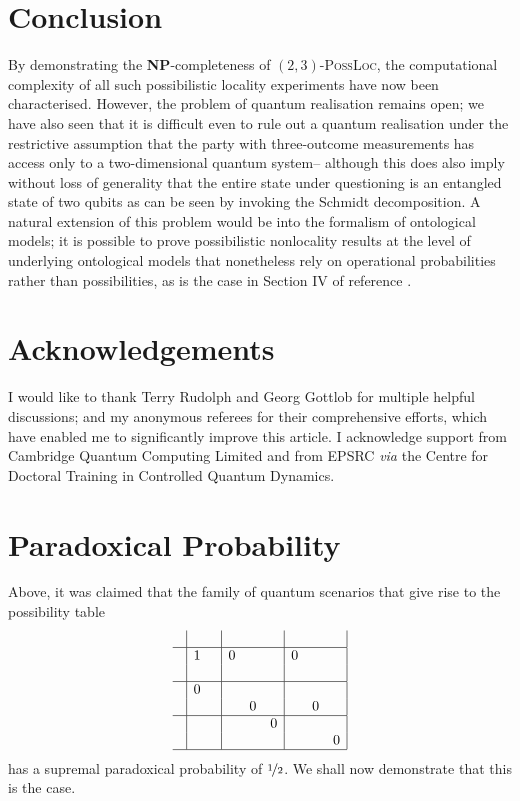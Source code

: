 \documentclass[reprint]{revtex4-1}
\theoremstyle{definition}
\begin{document}
 \section{Conclusion}
 
 By demonstrating the \textbf{NP}-completeness of $(2,3)$-\textsc{PossLoc}, the computational complexity of all such possibilistic locality experiments have now been characterised. However, the problem of quantum realisation remains open; we have also seen that it is difficult even to rule out a quantum realisation under the restrictive assumption that the party with three-outcome measurements has access only to a two-dimensional quantum system-- although this does also imply without loss of generality that the entire state under questioning is an entangled state of two qubits as can be seen by invoking the Schmidt decomposition. A natural extension of this problem would be into the formalism of ontological models; it is possible to prove possibilistic nonlocality results at the level of underlying ontological models that nonetheless rely on operational probabilities rather than possibilities, as is the case in Section IV of reference  \cite{Jevt2015}.

\section*{Acknowledgements}

I would like to thank Terry Rudolph and Georg Gottlob for multiple helpful discussions; and my anonymous referees for their comprehensive efforts, which have enabled me to significantly improve this article. I acknowledge support from Cambridge Quantum Computing Limited and from EPSRC \emph{via} the Centre for Doctoral Training in Controlled Quantum Dynamics.

{}


\appendix
\iffalse
\section{Paradoxical Probability}

Above, it was claimed that the family of quantum scenarios that give rise to the possibility table
\begin{equation*}
\begin{array}{ c | c c | c c c| c c c|}
&&&&&&&& \\ \hline
&1&&0&&&0&&\\
   &&&&&&&&\\ \hline
   &0&&&&&&&\\ 
  &&&&0&&&0&\\ \hline
  &&&&&0&&&\\ 
  &&&&&&&&0\\ \hline
\end{array}
\end{equation*}
has a supremal paradoxical probability of $\nicefrac12$. We shall now demonstrate that this is the case.
\end{document}
